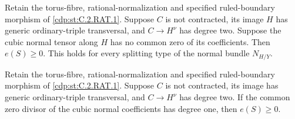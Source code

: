 \begin{proposition}\hypertarget{tag-01CJ}{}\label{cdp:st:C.2.RAT.7}


Retain the torus-fibre, rational-normalization and specified
ruled-boundary morphism of \ref{cdp:st:C.2.RAT.1}. Suppose $C$ is not
contracted, its image $H$ has generic ordinary-triple
transversal, and $C\to H^\nu$ has degree two. Suppose
the cubic normal tensor along $H$ has no common zero of
its coefficients. Then $e(S)\ge0$. This holds for every
splitting type of the normal bundle $N_{H/Y}$.
\end{proposition}

\begin{proposition}\hypertarget{tag-01CK}{}\label{cdp:st:C.2.RAT.8}


Retain the torus-fibre, rational-normalization and specified
ruled-boundary morphism of \ref{cdp:st:C.2.RAT.1}. Suppose $C$ is not
contracted, its image has generic ordinary-triple transversal,
and $C\to H^\nu$ has degree two. If the common zero divisor
of the cubic normal coefficients has degree one, then
$e(S)\ge0$.
\end{proposition}

